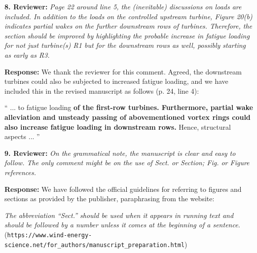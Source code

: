 \documentclass[]{article}
\begin{document}
\dotfill

\textbf{8. Reviewer: } \textit{Page 22 around line 5, the (inevitable) discussions on loads are included. In addition
	to the loads on the controlled upstream turbine, Figure 20(b) indicates partial wakes
	on the further downstream rows of turbines. Therefore, the section should be improved
	by highlighting the probable increase in fatigue loading for not just turbine(s) R1 but for
	the downstream rows as well, possibly starting as early as R3.}

\textbf{Response: } We thank the reviewer for this comment. Agreed, the downstream turbines could also be subjected to increased fatigue loading, and we have included this in the revised manuscript as follows (p. 24, line 4):

``
... to fatigue loading \textbf{of the first-row turbines. Furthermore, partial wake alleviation and unsteady passing of abovementioned vortex rings could also increase fatigue loading in downstream rows.} Hence, structural aspects ...
''

\dotfill

\clearpage

\textbf{9. Reviewer: } \textit{On the grammatical note, the manuscript is clear and easy to follow. The only comment
	might be on the use of Sect. or Section; Fig. or Figure references.}

\textbf{Response: } We have followed the official guidelines for referring to figures and sections as provided by the publisher, paraphrasing from the website:\

\emph{The abbreviation ``Sect.'' should be used when it appears in running text and should be followed by a number unless it comes at the beginning of a sentence.}\\({\small \verb|https://www.wind-energy-science.net/for_authors/manuscript_preparation.html|})
\end{document}
